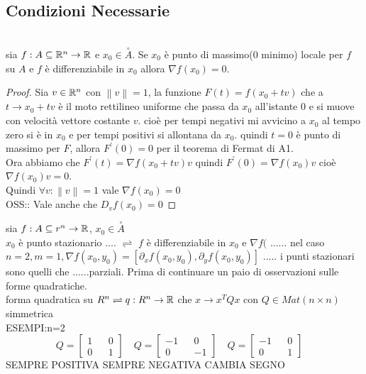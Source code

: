 \subsection{Condizioni Necessarie}
\\
sia $f:A\subseteq \mathbb{R}^n\rightarrow \mathbb{R}$ e $x_0\in\overset{\circ}A$. Se $x_0$ è punto di massimo(0 minimo) locale per $f$ su $A$ e $f$ è differenziabile in $x_0$ allora $\nabla f(x_0)=0$.
\begin{proof}
	Sia $v\in \mathbb{R}^n$ con $\left\| v\right\| =1$, la funzione $F(t)= f(x_0+tv)$ che a $t\rightarrow x_0+tv$ è il moto rettilineo uniforme che passa da $x_0$ all'istante $0$ e si muove con velocità vettore costante $v$. cioè per tempi negativi mi avvicino a $x_0$ al tempo zero si è in $x_0$ e per tempi positivi si allontana da $x_0$. quindi $t=0$ è punto di massimo per $F$, allora $F^{'}(0) = 0$ per il teorema di Fermat di A1.\\
	Ora abbiamo che $F^{'}(t)=\nabla f(x_0+tv)v$ quindi $F^{'}(0)=\nabla f(x_0)v$ cioè $\nabla f(x_0)v=0$.\\
	Quindi $\forall v :\left\| v\right\| =1$ vale $\nabla f(x_0)=0$\\
	OSS:: Vale anche che $D_vf(x_0)=0$
\end{proof}
sia $f:A\subseteq r^n\rightarrow \mathbb{R}$, $x_0\in\overset{\circ}{A}$\\
$x_0$ è punto stazionario .... $\rightleftharpoons$ $f$ è differenziabile in $x_0$ e $\nabla f($ ......
\observation
nel caso $n=2, m=1, \nabla f(x_0,y_0)=[\partial_xf(x_0,y_0), \partial_yf(x_0,y_0)]$ ..... i punti stazionari sono quelli che ......parziali.
\observation
Prima di continuare un paio di osservazioni sulle forme quadratiche.\\
forma quadratica su $R^n \rightleftharpoons q:R^n\rightarrow \mathbb{R}$ che $x\rightarrow x^TQx$ con $Q\in Mat(n\times n)$ simmetrica\\
ESEMPI:n=2\\
$$
Q=\begin{bmatrix}1&&0\\0&&1\end{bmatrix}\quad
Q=\begin{bmatrix}-1&&0\\0&&-1\end{bmatrix}\quad
Q=\begin{bmatrix}-1&&0\\0&&1\end{bmatrix}\quad 
$$
SEMPRE POSITIVA SEMPRE NEGATIVA CAMBIA SEGNO\\
